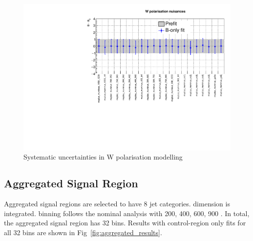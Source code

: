 \begin{figure}[h!]
  \centering
  \caption{Systematic uncertainties in W polarisation modelling}
  \includegraphics[width=0.8\linewidth]{figures/results/36invfb_freeze/postfit/nuis/WPol_nuisances}
\end{figure}

\subsection{Aggregated Signal Region}
\label{app:aggregated}
Aggregated signal regions are selected to have 8 jet categories. 
\scalht dimension is integrated. \HTmiss binning follows the nominal 
analysis with 200, 400, 600, 900 \gev. In total, the aggregated signal 
region has 32 bins. Results with control-region only fits for all 32 bins 
are shown in Fig~\ref{fig:aggregated_results}.

